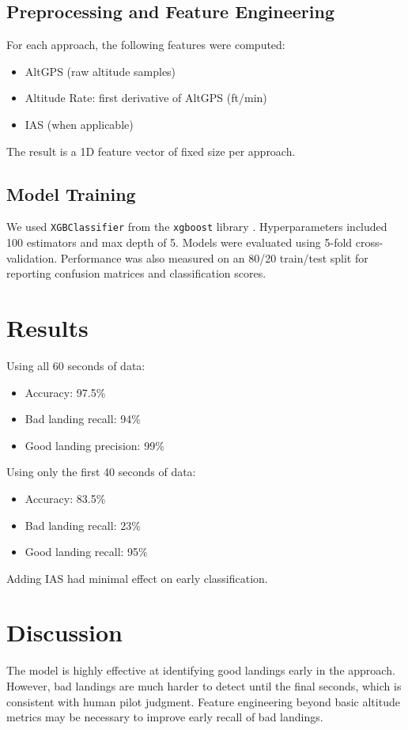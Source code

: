 \documentclass[conference]{IEEEtran}
\begin{document}
\subsection{Preprocessing and Feature Engineering}
For each approach, the following features were computed:
\begin{itemize}
    \item AltGPS (raw altitude samples)
    \item Altitude Rate: first derivative of AltGPS (ft/min)
    \item IAS (when applicable)
\end{itemize}
The result is a 1D feature vector of fixed size per approach.

\subsection{Model Training}
We used \texttt{XGBClassifier} from the \texttt{xgboost} library \cite{chen2016xgboost}. Hyperparameters included 100 estimators and max depth of 5. Models were evaluated using 5-fold cross-validation. Performance was also measured on an 80/20 train/test split for reporting confusion matrices and classification scores.

\section{Results}

Using all 60 seconds of data:
\begin{itemize}
    \item Accuracy: 97.5\%
    \item Bad landing recall: 94\%
    \item Good landing precision: 99\%
\end{itemize}

Using only the first 40 seconds of data:
\begin{itemize}
    \item Accuracy: 83.5\%
    \item Bad landing recall: 23\%
    \item Good landing recall: 95\%
\end{itemize}

Adding IAS had minimal effect on early classification.

\section{Discussion}
The model is highly effective at identifying good landings early in the approach. However, bad landings are much harder to detect until the final seconds, which is consistent with human pilot judgment. Feature engineering beyond basic altitude metrics may be necessary to improve early recall of bad landings.
\end{document}
